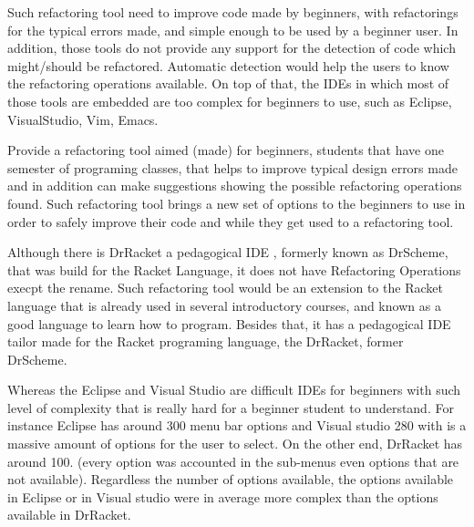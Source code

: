 Such refactoring tool need to improve code made by beginners, with refactorings for %
the typical errors made, and simple enough to be used by a beginner user.
In addition, those tools do not provide any support for the detection of code which might/should
be refactored.
Automatic detection would help the users to know the refactoring operations available.
On top of that, the IDEs in which most of those tools are embedded are too complex for beginners
to use, such as Eclipse\cite{carlson2005eclipse}, VisualStudio, Vim, Emacs. %

Provide a refactoring tool aimed (made) for beginners, students that have one semester %
of programing classes, that helps to improve typical design errors made and in addition can
make suggestions showing the possible refactoring operations found.
Such refactoring tool brings a new set of options to the beginners to use
in order to safely improve their code and while they get used to a refactoring tool.

Although there is DrRacket a pedagogical IDE \cite{drscheme} \cite{drscheme_pegadogy},
formerly known as DrScheme, that was
build for the Racket Language, it does not have Refactoring Operations execpt the rename.
Such refactoring tool would be an extension to the Racket language that is already
used in several introductory courses,
and known as a good language to learn how to program.
Besides that, it has a pedagogical IDE tailor made for the Racket programing language,
the DrRacket, former DrScheme. %


Whereas the Eclipse and Visual Studio are difficult IDEs for beginners with such level of
complexity that is really hard for a beginner student to understand.
For instance Eclipse has around 300 menu bar options and Visual studio 280 with is a massive amount
of options for the user to select.
On the other end, DrRacket has around 100. (every option was accounted in the sub-menus %
even options that are not available).
Regardless the number of options available, the options available in Eclipse or
in Visual studio were in average more complex than the options available in DrRacket.



